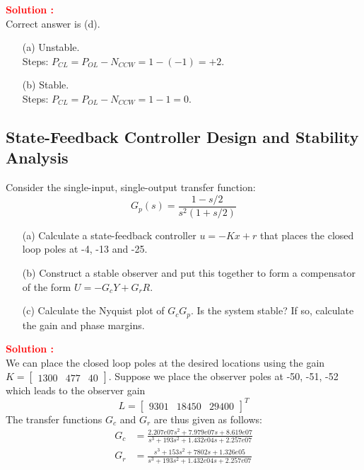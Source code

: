 \documentclass[12pt]{article}
\newcommand{\bmat}[1]{\begin{bmatrix} #1 \end{bmatrix}}
\begin{document}
\textbf{\textcolor{red}{Solution :}} \\
Correct answer is (d).\\
\begin{itemize}
    \item[(a)] Unstable. \\
    Steps: $P_{CL} = P_{OL} - N_{CCW} = 1 - (-1) = +2.$
    \item[(b)] Stable. \\
    Steps: $P_{CL} = P_{OL} - N_{CCW} = 1 - 1 = 0.$
\end{itemize}
\clearpage

\subsection{State-Feedback Controller Design and Stability Analysis}

Consider the single-input, single-output transfer function:
$$G_p(s) = \frac{1-s/2}{s^2 (1+s/2)}$$
\begin{itemize}
    \item[(a)] Calculate a state-feedback controller $u = - K x + r$ that places the closed loop poles at -4, -13 and -25.
    \item[(b)] Construct a stable observer and put this together to form a compensator of the form $U=-G_c Y + G_r R$.
    \item[(c)] Calculate the Nyquist plot of $G_cG_p$. Is the system stable? If so, calculate the gain and phase margins.
\end{itemize}
  

\textbf{\textcolor{red}{Solution :}} \\
We can place the closed loop poles at the desired locations using the gain $K =\bmat{1300 & 477 & 40}$. Suppose we place the observer poles at -50, -51, -52 which leads to the observer gain  $$L =\bmat{ 9301 & 18450 & 29400}^T $$ The transfer functions $G_c$ and $G_r$ are thus given as follows:
\begin{align*}
    G_c &=\frac{2.207e07 s^2 + 7.979e07 s + 8.619e07}{s^3 + 193s^2 + 1.432e04s + 2.257e07} \\
    G_r &= \frac{s^3 + 153s^2 + 7802s + 1.326e05}{s^3 + 193s^2 + 1.432e04s + 2.257e07}
\end{align*}
\end{document}

